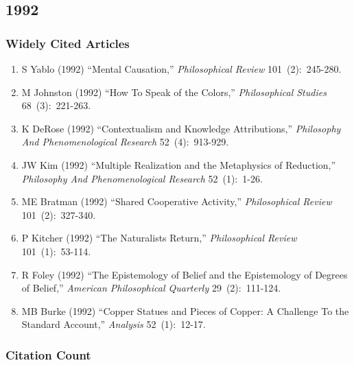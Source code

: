 \documentclass[
  10pt,
  letterpaper,
  DIV=11,
  numbers=noendperiod,
  twoside]{scrartcl}
\providecommand{\tightlist}{%
  \setlength{\itemsep}{0pt}\setlength{\parskip}{0pt}}\usepackage{longtable,booktabs,array}
\begin{document}
\newpage

\subsection{1992}\label{sec-s1992}

\subsubsection*{Widely Cited Articles}\label{widely-cited-articles-36}

\begin{enumerate}
\def\labelenumi{\arabic{enumi}.}
\tightlist
\item
  S Yablo (1992) ``Mental Causation,'' \emph{Philosophical Review}
  101~(2):~245-280.
\item
  M Johnston (1992) ``How To Speak of the Colors,'' \emph{Philosophical
  Studies} 68~(3):~221-263.
\item
  K DeRose (1992) ``Contextualism and Knowledge Attributions,''
  \emph{Philosophy And Phenomenological Research} 52~(4):~913-929.
\item
  JW Kim (1992) ``Multiple Realization and the Metaphysics of
  Reduction,'' \emph{Philosophy And Phenomenological Research}
  52~(1):~1-26.
\item
  ME Bratman (1992) ``Shared Cooperative Activity,'' \emph{Philosophical
  Review} 101~(2):~327-340.
\item
  P Kitcher (1992) ``The Naturalists Return,'' \emph{Philosophical
  Review} 101~(1):~53-114.
\item
  R Foley (1992) ``The Epistemology of Belief and the Epistemology of
  Degrees of Belief,'' \emph{American Philosophical Quarterly}
  29~(2):~111-124.
\item
  MB Burke (1992) ``Copper Statues and Pieces of Copper: A Challenge To
  the Standard Account,'' \emph{Analysis} 52~(1):~12-17.
\end{enumerate}

\subsubsection*{Citation Count}\label{sec-count-1992}
\end{document}
